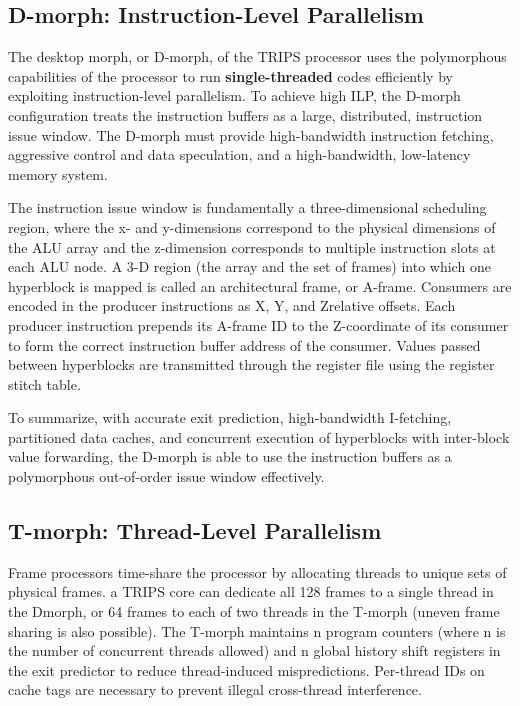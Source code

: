 \documentclass[UTF8,12pt,a4paper]{article}
\begin{document}
\subsection{D-morph: Instruction-Level Parallelism}
The desktop morph, or D-morph, of the TRIPS processor
uses the polymorphous capabilities of the processor
to run \textbf{single-threaded} codes efficiently by exploiting
instruction-level parallelism.
To achieve high ILP, the D-morph configuration treats
the instruction buffers as a large, distributed, instruction issue window.
The D-morph must provide high-bandwidth instruction fetching,
aggressive control and data speculation, and a high-bandwidth, low-latency memory system.

The instruction issue window is fundamentally a three-dimensional scheduling region,
where the x- and y-dimensions correspond to the physical dimensions of the ALU array
and the z-dimension corresponds to multiple instruction slots at each ALU node.
A 3-D region (the array and the set of frames) into
which one hyperblock is mapped is called an architectural frame, or A-frame.
Consumers are encoded in the producer instructions as X, Y, and Zrelative offsets.
Each producer instruction prepends its A-frame ID to the Z-coordinate of its consumer to
form the correct instruction buffer address of the consumer.
Values passed between hyperblocks are transmitted through
the register file using the register stitch table.

To summarize, with accurate exit prediction, high-bandwidth I-fetching,
partitioned data caches, and concurrent execution of hyperblocks with inter-block value forwarding,
the D-morph is able to use the instruction buffers as a polymorphous out-of-order issue window effectively.

\subsection{T-morph: Thread-Level Parallelism}
Frame processors time-share the processor by allocating threads to unique sets of physical frames.
a TRIPS core can dedicate all 128 frames to a single thread in the Dmorph,
or 64 frames to each of two threads in the T-morph (uneven frame sharing is also possible).
The T-morph maintains n program counters (where n is the number of concurrent threads allowed)
and n global history shift registers in the exit predictor to reduce thread-induced mispredictions.
Per-thread IDs on cache tags are necessary to prevent illegal cross-thread interference.
\end{document}
